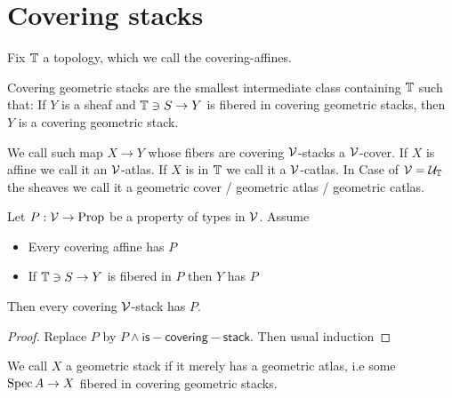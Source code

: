 \documentclass{article}
\begin{document}
\section{Covering stacks}
Fix $\mathbb{T}$ a topology, which we call the covering-affines.
\begin{definition}
	Covering geometric stacks are the smallest intermediate class containing $\mathbb{T}$ such that: If $Y$ is a sheaf and $\mathbb{T} \ni S \to Y$ is fibered in covering geometric stacks, then $Y$ is a covering geometric stack.	
\end{definition}


We call such map $X \to Y$ whose fibers are covering $\mathcal{V}$-stacks a $\mathcal{V}$-cover. If $X$ is affine we call it an $\mathcal{V}$-atlas. If $X$ is in $\mathbb{T}$ we call it a $\mathcal{V}$-catlas. In Case of $\mathcal{V} = \mathcal{U}_{\mathbb{T}}$ the sheaves we call it a geometric cover / geometric atlas / geometric catlas.
\begin{prop}
 Let $P : \mathcal{V} \to \operatorname{Prop}$ be a property of types in $\mathcal{V}$. Assume
 \begin{itemize}
 	\item Every covering affine has $P$
 	\item If $\mathbb{T} \ni S \to Y$ is fibered in $P$ then $Y$ has $P$
 \end{itemize}
Then every covering $\mathcal{V}$-stack has $P$.
\end{prop}
\begin{proof}
		Replace $P$ by $P \land \mathsf{is-covering-stack}$. Then usual induction

\end{proof}
\begin{definition}
	We call $X$ a geometric stack if it merely has a geometric atlas, i.e some $\operatorname{Spec} A \to X$ fibered in covering geometric stacks.
\end{definition}
\end{document}
